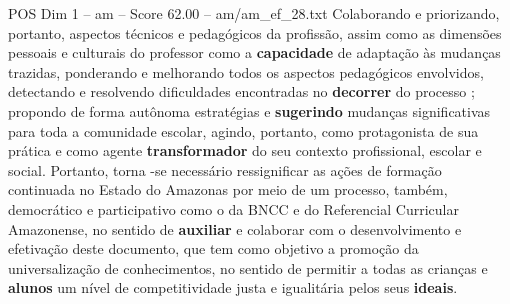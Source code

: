 \begin{textsample}{POS Dim 1 – am – Score 62.00 – am/am\_ef\_28.txt}
Colaborando e priorizando, portanto, aspectos técnicos e pedagógicos da profissão, assim como as dimensões pessoais e culturais do professor como a \textbf{capacidade} de adaptação às mudanças trazidas, ponderando e melhorando todos os aspectos pedagógicos envolvidos, detectando e resolvendo dificuldades encontradas no \textbf{decorrer} do processo ; propondo de forma autônoma estratégias e \textbf{sugerindo} mudanças significativas para toda a comunidade escolar, agindo, portanto, como protagonista de sua prática e como agente \textbf{transformador} do seu contexto profissional, escolar e social.
Portanto, torna -se necessário ressignificar as ações de formação continuada no Estado do Amazonas por meio de um processo, também, democrático e participativo como o da BNCC e do Referencial Curricular Amazonense, no sentido de \textbf{auxiliar} e colaborar com o desenvolvimento e efetivação deste documento, que tem como objetivo a promoção da universalização de conhecimentos, no sentido de permitir a todas as crianças e \textbf{alunos} um nível de competitividade justa e igualitária pelos seus \textbf{ideais}.

\end{textsample}
